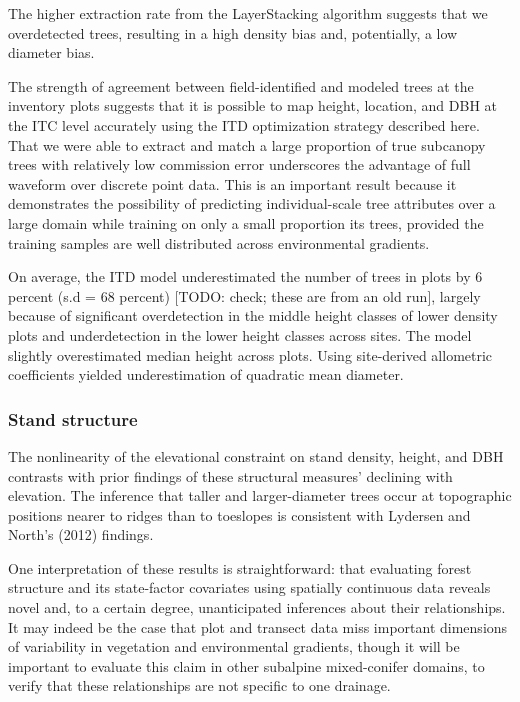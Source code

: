\documentclass[
  12pt,
]{article}
\begin{document}
The higher extraction rate from the LayerStacking algorithm suggests
that we overdetected trees, resulting in a high density bias and,
potentially, a low diameter bias.

The strength of agreement between field-identified and modeled trees at
the inventory plots suggests that it is possible to map height,
location, and DBH at the ITC level accurately using the ITD optimization
strategy described here. That we were able to extract and match a large
proportion of true subcanopy trees with relatively low commission error
underscores the advantage of full waveform over discrete point data.
This is an important result because it demonstrates the possibility of
predicting individual-scale tree attributes over a large domain while
training on only a small proportion its trees, provided the training
samples are well distributed across environmental gradients.

On average, the ITD model underestimated the number of trees in plots by
6 percent (s.d = 68 percent) {[}TODO: check; these are from an old
run{]}, largely because of significant overdetection in the middle
height classes of lower density plots and underdetection in the lower
height classes across sites. The model slightly overestimated median
height across plots. Using site-derived allometric coefficients yielded
underestimation of quadratic mean diameter.

\subsubsection{Stand structure}\label{stand-structure}

The nonlinearity of the elevational constraint on stand density, height,
and DBH contrasts with prior findings of these structural measures'
declining with elevation. The inference that taller and larger-diameter
trees occur at topographic positions nearer to ridges than to toeslopes
is consistent with Lydersen and North's (2012) findings.

One interpretation of these results is straightforward: that evaluating
forest structure and its state-factor covariates using spatially
continuous data reveals novel and, to a certain degree, unanticipated
inferences about their relationships. It may indeed be the case that
plot and transect data miss important dimensions of variability in
vegetation and environmental gradients, though it will be important to
evaluate this claim in other subalpine mixed-conifer domains, to verify
that these relationships are not specific to one drainage.
\end{document}
